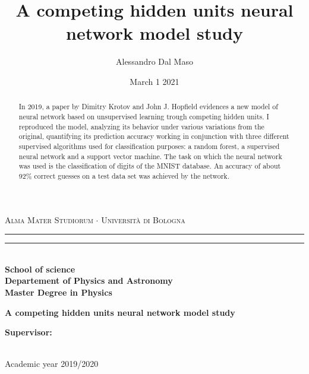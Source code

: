\documentclass[a4paper]{report}
\title{A competing hidden units neural network model study}
\author{Alessandro Dal Maso}
\date{March 1 2021}
\begin{document}
\begin{titlepage}
\begin{center}
{{\Large{\textsc{Alma Mater Studiorum $\cdot$ Universit\`a di Bologna}}}}
\rule[0.1cm]{15.8cm}{0.1mm}
\rule[0.5cm]{15.8cm}{0.6mm}
\\\vspace{3mm}
{\small{\bf School of science \\
Departement of Physics and Astronomy\\
Master Degree in Physics}}
\end{center}
\vspace{23mm}
\begin{center}{
{\LARGE{\bf A competing hidden units neural network model study}}\\
}\end{center}
\vspace{50mm} \par \noindent
\begin{minipage}[t]{0.47\textwidth}
{\large{\bf Supervisor: \vspace{2mm}{
\newline Prof. Enrico Giampieri}\\\\}}
\end{minipage}
%
\hfill
%
\begin{minipage}[t]{0.47\textwidth}
\end{minipage}
\vspace{40mm}
\begin{center}
Academic year{ 2019/2020}
\end{center}
\end{titlepage}
\begin{abstract}
In 2019, a paper by Dimitry Krotov and John J. Hopfield evidences a new model of neural network based on unsupervised learning trough competing hidden units. I reproduced the model, analyzing its behavior under various variations from the original, quantifying its prediction accuracy working in conjunction with three different supervised algorithms used for classification purposes: a random forest, a supervised neural network and a support vector machine. The task on which the neural network was used is the classification of digits of the MNIST database. An accuracy of about 92\% correct guesses on a test data set was achieved by the network.

\end{abstract}
\tableofcontents
\end{document}

